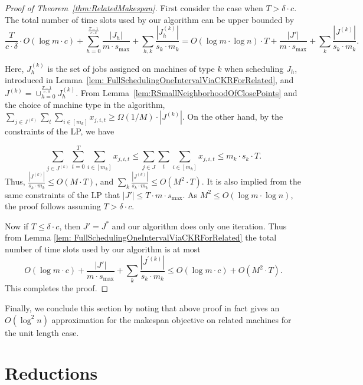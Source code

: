   \begin{proof}[Proof of Theorem~\ref{thm:RelatedMakespan}]
      
  First consider the case when $T > \delta \cdot c$. The total number of time slots used by our algorithm can be upper bounded by
  \[
  \frac{T}{c \cdot \delta} \cdot O(\log m \cdot c)  +\sum^{\frac{T-1}{c \cdot \delta}}_{h = 0} \frac{|J_h|}{m\cdot s_{\max}} + \sum_{h,k} \frac{|J_{h}^{(k)}|}{s_k \cdot m_k}=O(\log m \cdot \log n)  \cdot T  +  \frac{|J'|}{m\cdot s_{\max}}+\sum_{k}\frac{|J^{(k)}|}{s_k \cdot m_k}.
  \]
  
  Here, $J_h^{(k)}$ is the set of jobs assigned on machines of type $k$ when scheduling $J_h$, introduced in Lemma~\ref{lem: FullSchedulingOneIntervalViaCKRForRelated}, and $J^{(k)} = \cup_{h=0}^{\frac{T-1}{c \cdot \delta}} J_h^{(k)}$. 
  From Lemma~\ref{lem:RSmallNeighborhoodOfClosePoints} and the choice of machine type in the algorithm, 
  $\sum_{j \in J^{(k)}} \sum_{t} \sum_{i \in [m_k]} x_{j,i,t} \geq \Omega(1/M) \cdot |J^{(k)}|$. On the other hand, by the constraints of the LP, we have
  
  \[
  \sum_{j \in J^{(k)}} \sum^{T}_{t = 0} \sum_{i \in [m_k]} x_{j,i,t} \le \sum_{j \in J} \sum_{t} \sum_{i \in [m_k]} x_{j,i,t} \le m_k \cdot s_k \cdot T.
  \]
  Thus, $\frac{|J^{(k)}|}{s_k \cdot m_k }\le O(M \cdot T)$, and $\sum_{k}\frac{|J^{(k)}|}{s_k \cdot m_k} \leq O(M^2 \cdot T)$.
  It is also implied from the same constraints of the LP that $|J'| \leq T \cdot m \cdot s_{\max}$.
  As $M^2 \leq O(\log m \cdot \log n)$,  the proof follows assuming $T > \delta \cdot c$.
  
  Now if $T \leq \delta \cdot c$, then $J' = J^*$ and our algorithm does only one iteration. Thus from  Lemma \ref{lem: FullSchedulingOneIntervalViaCKRForRelated}
  the total number of time slots used by our algorithm is at most
  $$
  O(\log m \cdot c ) + \frac{|J'|}{m\cdot s_{\max}}+\sum_k \frac{|J^{'(k)}|}{s_k \cdot m_k} \leq O(\log m \cdot c )  + O(M^2 \cdot T).
  $$ 
  This completes the proof.
  \end{proof}
  
  Finally, we conclude this section by noting that above proof in fact gives an $O(\log^2 n)$ approximation for the makespan objective on related machines for the unit length case.
  
  
  
  \section{Reductions}
  \label{sec:reduction2}
  
